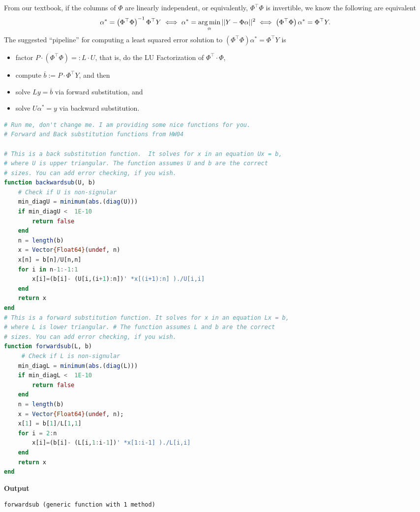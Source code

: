 \begin{tcolorbox}[sharp corners, colback=green!30, colframe=green!80!blue, title=\textbf{\Large Large Scale Least Squares via the LU Factorization}]
 From our textbook,  if the columns of $\Phi$ are linearly independent, or equivalently, $\Phi^\top \Phi$ is invertible, we know the following are equivalent 
  \begin{equation}
    \label{eq:ThmLeastSqaredErrorSolution2secondTime}
  \alpha^\ast = \left( \Phi^\top \Phi \right)^{-1}\Phi^\top Y  \iff  \alpha^\ast = \operatorname*{arg\,min}_{\alpha} ||Y-\Phi \alpha ||^2 \iff \left( \Phi^\top \Phi \right) \alpha^\ast = \Phi^\top Y.
\end{equation}
The suggested ``pipeline'' for  computing a least squared error solution to $ \left( \Phi^\top \Phi \right) \alpha^\ast = \Phi^\top Y$ is 
\begin{itemize}
    \item factor $P \cdot \left( \Phi^\top \Phi \right)  =: L \cdot U$, that is, do the LU Factorization of $\Phi^\top \cdot \Phi$,
    \item compute $\overline{b}:= P \cdot \Phi^\top Y$, and then 
    \item solve $L y = \overline{b}$ via forward substitution, and
    \item solve $U \alpha^\ast =y$ via backward substitution.
\end{itemize}
\end{tcolorbox}

\begin{lstlisting}[language=Julia,style=mystyle]
# Run me, don't change me. I am providing some nice functions for you.
# Forward and Back substitution functions from HW04

# This is a back substitution function.  It solves for x in an equation Ux = b, 
# where U is upper triangular. The function assumes U and b are the correct 
# sizes. You can add error checking, if you wish.
function backwardsub(U, b)
    # Check if U is non-signular
    min_diagU = minimum(abs.(diag(U)))
    if min_diagU <  1E-10
        return false
    end
    n = length(b)
    x = Vector{Float64}(undef, n) 
    x[n] = b[n]/U[n,n]
    for i in n-1:-1:1
        x[i]=(b[i]- (U[i,(i+1):n])' *x[(i+1):n] )./U[i,i]
    end
    return x
end
# This is a forward substitution function. It solves for x in an equation Lx = b, 
# where L is lower triangular. # The function assumes L and b are the correct 
# sizes. You can add error checking, if you wish.
function forwardsub(L, b)
     # Check if L is non-signular
    min_diagL = minimum(abs.(diag(L)))
    if min_diagL <  1E-10
        return false
    end
    n = length(b)
    x = Vector{Float64}(undef, n); 
    x[1] = b[1]/L[1,1] 
    for i = 2:n 
        x[i]=(b[i]- (L[i,1:i-1])' *x[1:i-1] )./L[i,i] 
    end
    return x
end
\end{lstlisting}
\textbf{Output} 
\begin{verbatim}
forwardsub (generic function with 1 method)
\end{verbatim}

